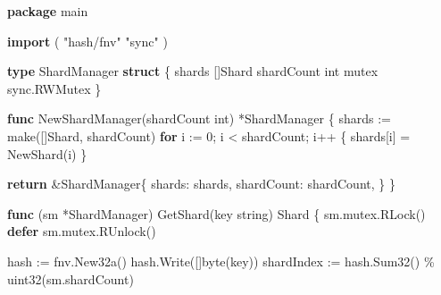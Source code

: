\documentclass[
]{article}
\newenvironment{Shaded}{}{}
\newcommand{\BuiltInTok}[1]{\textcolor[rgb]{0.00,0.50,0.00}{#1}}
\newcommand{\ControlFlowTok}[1]{\textcolor[rgb]{0.00,0.44,0.13}{\textbf{#1}}}
\newcommand{\DataTypeTok}[1]{\textcolor[rgb]{0.56,0.13,0.00}{#1}}
\newcommand{\DecValTok}[1]{\textcolor[rgb]{0.25,0.63,0.44}{#1}}
\newcommand{\KeywordTok}[1]{\textcolor[rgb]{0.00,0.44,0.13}{\textbf{#1}}}
\newcommand{\NormalTok}[1]{#1}
\newcommand{\OperatorTok}[1]{\textcolor[rgb]{0.40,0.40,0.40}{#1}}
\newcommand{\StringTok}[1]{\textcolor[rgb]{0.25,0.44,0.63}{#1}}
\begin{document}
\begin{Shaded}
\begin{Highlighting}[]
\KeywordTok{package}\NormalTok{ main}

\KeywordTok{import} \OperatorTok{(}
    \StringTok{"hash/fnv"}
    \StringTok{"sync"}
\OperatorTok{)}

\KeywordTok{type}\NormalTok{ ShardManager }\KeywordTok{struct} \OperatorTok{\{}
\NormalTok{    shards     }\OperatorTok{[]}\NormalTok{Shard}
\NormalTok{    shardCount }\DataTypeTok{int}
\NormalTok{    mutex      sync}\OperatorTok{.}\NormalTok{RWMutex}
\OperatorTok{\}}

\KeywordTok{func}\NormalTok{ NewShardManager}\OperatorTok{(}\NormalTok{shardCount }\DataTypeTok{int}\OperatorTok{)} \OperatorTok{*}\NormalTok{ShardManager }\OperatorTok{\{}
\NormalTok{    shards }\OperatorTok{:=} \BuiltInTok{make}\OperatorTok{([]}\NormalTok{Shard}\OperatorTok{,}\NormalTok{ shardCount}\OperatorTok{)}
    \ControlFlowTok{for}\NormalTok{ i }\OperatorTok{:=} \DecValTok{0}\OperatorTok{;}\NormalTok{ i }\OperatorTok{\textless{}}\NormalTok{ shardCount}\OperatorTok{;}\NormalTok{ i}\OperatorTok{++} \OperatorTok{\{}
\NormalTok{        shards}\OperatorTok{[}\NormalTok{i}\OperatorTok{]} \OperatorTok{=}\NormalTok{ NewShard}\OperatorTok{(}\NormalTok{i}\OperatorTok{)}
    \OperatorTok{\}}

    \ControlFlowTok{return} \OperatorTok{\&}\NormalTok{ShardManager}\OperatorTok{\{}
\NormalTok{        shards}\OperatorTok{:}\NormalTok{     shards}\OperatorTok{,}
\NormalTok{        shardCount}\OperatorTok{:}\NormalTok{ shardCount}\OperatorTok{,}
    \OperatorTok{\}}
\OperatorTok{\}}

\KeywordTok{func} \OperatorTok{(}\NormalTok{sm }\OperatorTok{*}\NormalTok{ShardManager}\OperatorTok{)}\NormalTok{ GetShard}\OperatorTok{(}\NormalTok{key }\DataTypeTok{string}\OperatorTok{)}\NormalTok{ Shard }\OperatorTok{\{}
\NormalTok{    sm}\OperatorTok{.}\NormalTok{mutex}\OperatorTok{.}\NormalTok{RLock}\OperatorTok{()}
    \ControlFlowTok{defer}\NormalTok{ sm}\OperatorTok{.}\NormalTok{mutex}\OperatorTok{.}\NormalTok{RUnlock}\OperatorTok{()}

\NormalTok{    hash }\OperatorTok{:=}\NormalTok{ fnv}\OperatorTok{.}\NormalTok{New32a}\OperatorTok{()}
\NormalTok{    hash}\OperatorTok{.}\NormalTok{Write}\OperatorTok{([]}\DataTypeTok{byte}\OperatorTok{(}\NormalTok{key}\OperatorTok{))}
\NormalTok{    shardIndex }\OperatorTok{:=}\NormalTok{ hash}\OperatorTok{.}\NormalTok{Sum32}\OperatorTok{()} \OperatorTok{\%} \DataTypeTok{uint32}\OperatorTok{(}\NormalTok{sm}\OperatorTok{.}\NormalTok{shardCount}\OperatorTok{)}


\end{Highlighting}
\end{Shaded}
\end{document}
